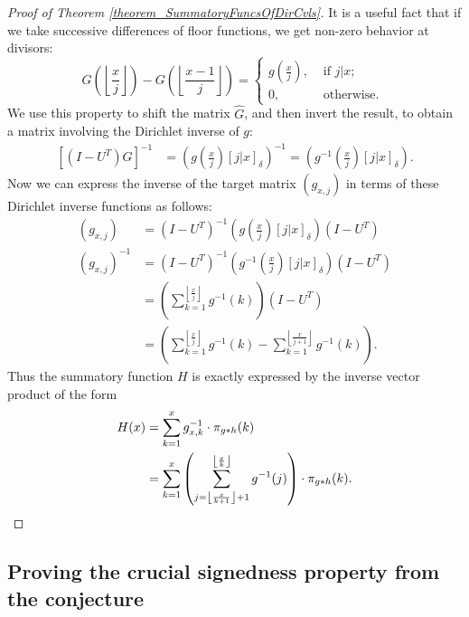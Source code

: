 \documentclass[11pt,reqno,a4letter]{article}
\numberwithin{figure}{section}
\numberwithin{table}{section}
\newcommand{\Iverson}[1]{\ensuremath{\left[#1\right]_{\delta}}}
\newcommand{\floor}[1]{\left\lfloor #1 \right\rfloor}
\theoremstyle{plain}
\numberwithin{theorem}{section}
\theoremstyle{definition}
\begin{document}
\begin{proof}[Proof of Theorem \ref{theorem_SummatoryFuncsOfDirCvls}]
It is a useful fact that if we take successive differences of floor functions, we get non-zero behavior at divisors: 
\[
G\left(\floor{\frac{x}{j}}\right) - G\left(\floor{\frac{x-1}{j}}\right) = 
     \begin{cases} 
     g\left(\frac{x}{j}\right), & \text{ if $j | x$; } \\ 
     0, & \text{ otherwise. } 
     \end{cases}
\]
We use this property to shift the matrix $\hat{G}$, and then invert the result, to obtain a matrix involving the 
Dirichlet inverse of $g$: 
\begin{align*} 
\left[(I-U^{T}) \hat{G}\right]^{-1} & = \left(g\left(\frac{x}{j}\right) \Iverson{j|x}\right)^{-1} = 
     \left(g^{-1}\left(\frac{x}{j}\right) \Iverson{j|x}\right). 
\end{align*} 
Now we can express the inverse of the target matrix $(g_{x,j})$ in terms of these Dirichlet inverse functions 
as follows: 
\begin{align*} 
(g_{x,j}) & = (I-U^{T})^{-1} \left(g\left(\frac{x}{j}\right) \Iverson{j|x}\right) (I-U^{T}) \\ 
(g_{x,j})^{-1} & = (I-U^{T})^{-1} \left(g^{-1}\left(\frac{x}{j}\right) \Iverson{j|x}\right) (I-U^{T}) \\ 
     & = \left(\sum_{k=1}^{\floor{\frac{x}{j}}} g^{-1}(k)\right) (I-U^{T}) \\ 
     & = \left(\sum_{k=1}^{\floor{\frac{x}{j}}} g^{-1}(k) - \sum_{k=1}^{\floor{\frac{x}{j+1}}} g^{-1}(k)\right). 
\end{align*} 
Thus the summatory function $H$ is exactly expressed by the inverse vector product of the form 
\begin{align*} 
H(x) & = \sum_{k=1}^x g_{x,k}^{-1} \cdot \pi_{g \ast h}(k) \\ 
     & = \sum_{k=1}^x \left(\sum_{j=\floor{\frac{x}{k+1}}+1}^{\floor{\frac{x}{k}}} g^{-1}(j)\right) \cdot \pi_{g \ast h}(k). 
     \qedhere
\end{align*} 
\end{proof} 

\subsection{Proving the crucial signedness property from the conjecture} 
\end{document}
